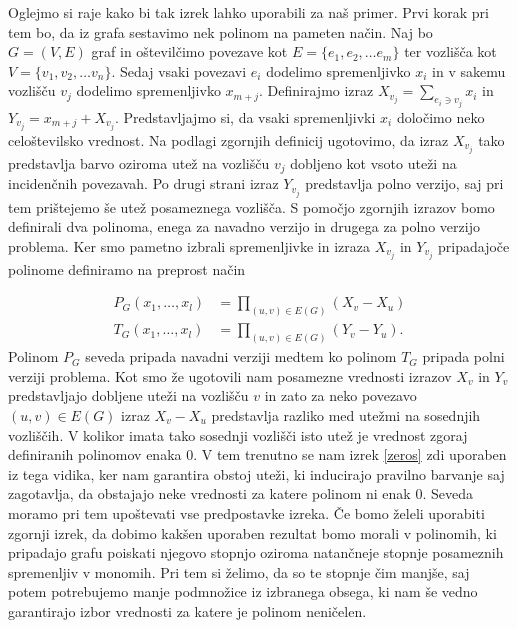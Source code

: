\documentclass[12pt,a4paper,twoside]{article}
\theoremstyle{definition} %
\theoremstyle{plain} %
\numberwithin{equation}{section}  %
\begin{document}
Oglejmo si raje kako bi tak izrek lahko uporabili za naš primer. Prvi korak pri tem bo, da iz grafa sestavimo nek polinom na pameten način. Naj bo $G = (V, E)$ graf in oštevilčimo povezave kot $E = \{e_1, e_2, \ldots e_m \}$ ter vozlišča kot $V = \{v_1, v_2, \ldots v_n\}$. Sedaj vsaki povezavi $e_i$ dodelimo spremenljivko $x_i$ in v sakemu vozlišču  $v_j$ dodelimo spremenljivko $x_{m + j}$. Definirajmo izraz $X_{v_j} = \sum_{e_i \ni v_j} x_i$ in $Y_{v_j} = x_{m+j} + X_{v_j}$. Predstavljajmo si, da vsaki spremenljivki $x_i$ določimo neko celoštevilsko vrednost. Na podlagi zgornjih definicij ugotovimo, da izraz $X_{v_j}$ tako predstavlja barvo oziroma utež na vozlišču $v_j$ dobljeno kot vsoto uteži na incidenčnih povezavah. Po drugi strani izraz $Y_{v_j}$ predstavlja polno verzijo, saj pri tem prištejemo še utež posameznega vozlišča. S pomočjo zgornjih izrazov bomo definirali dva polinoma, enega za navadno verzijo in drugega za polno verzijo problema. Ker smo pametno izbrali spremenljivke in izraza $X_{v_j}$ in $Y_{v_j}$ pripadajoče polinome definiramo na preprost način

\begin{equation*}
\begin{split}
P_{G}(x_1, \ldots, x_l) &= \prod_{(u, v) \in E(G)} \left( X_v- X_u \right) \\
T_{G}(x_1, \ldots, x_l) &= \prod_{(u, v) \in E(G)} \left( Y_v- Y_u \right).
\end{split}
\end{equation*}
Polinom $P_G$ seveda pripada navadni verziji medtem ko polinom $T_G$ pripada polni verziji problema. Kot smo že ugotovili nam posamezne vrednosti izrazov $X_v$ in $Y_v$ predstavljajo dobljene uteži na vozlišču $v$ in zato za neko povezavo $(u,v) \in E(G)$ izraz $X_v - X_u$ predstavlja razliko med utežmi na sosednjih vozliščih. V kolikor imata tako sosednji vozlišči isto utež je vrednost zgoraj definiranih polinomov enaka $0$. V tem trenutno se nam izrek \ref{zeros} zdi uporaben iz tega vidika, ker nam garantira obstoj uteži, ki inducirajo pravilno barvanje saj zagotavlja, da obstajajo neke vrednosti za katere polinom ni enak $0$. Seveda moramo pri tem upoštevati vse predpostavke izreka. Če bomo želeli uporabiti zgornji izrek, da dobimo kakšen uporaben rezultat bomo morali v polinomih, ki pripadajo grafu poiskati njegovo stopnjo oziroma natančneje stopnje posameznih spremenljiv v monomih. Pri tem si želimo, da so te stopnje čim manjše, saj potem potrebujemo manje podmnožice iz izbranega obsega, ki nam še vedno garantirajo izbor vrednosti za katere je polinom neničelen.
\end{document}
